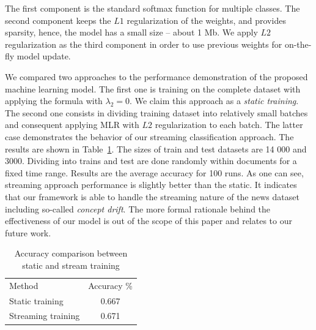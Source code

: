 The first component is the standard softmax function for multiple classes. The second component keeps the $L1$ regularization of the weights, and provides sparsity, hence, the model has a small size -- about 1 Mb. We apply $L2$ regularization as the third component in order to use previous weights for on-the-fly model update.

We compared two approaches to the performance demonstration of the proposed machine learning model. The first one is training on the complete dataset with applying the formula with $\lambda_2 = 0$. We claim this approach as a {\em static training}. The second one consists in dividing training dataset into relatively small batches and consequent applying MLR with $L2$ regularization to each batch. The latter case demonstrates the behavior of our streaming classification approach. The results are shown in Table~\ref{accuracy}. The sizes of train and test datasets are 14 000 and 3000. Dividing into trains and test are done randomly within documents for a fixed time range. Results are the average accuracy for 100 runs. As one can see, streaming approach performance is slightly better than the static. It indicates that our framework is able to handle the streaming nature of the news dataset including so-called {\em concept drift}. The more formal rationale behind the effectiveness of our model is out of the scope of this paper and relates to our future work.

\begin{table}[htbp]
\begin{tabular}{lc}
Method             & Accuracy \% \\
Static training    & 0.667       \\
Streaming training & 0.671         
\end{tabular}
\caption{Accuracy comparison between static and stream training}
\label{accuracy}
\vspace{-7mm}
\end{table}